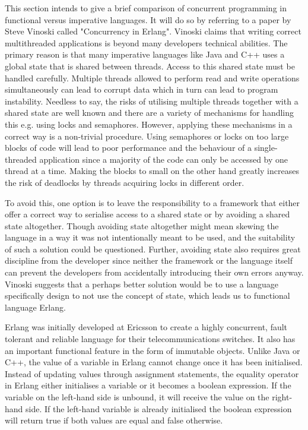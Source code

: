 \documentclass[conference]{IEEEtran}
\begin{document}
This section intends to give a brief comparison of concurrent programming in functional versus imperative languages. It will do so by referring to a paper by Steve Vinoski called "Concurrency in Erlang". Vinoski claims that writing correct multithreaded applications is beyond many developers technical abilities. The primary reason is that many imperative languages like Java and C++ uses a global state that is shared between threads. Access to this shared state must be handled carefully. Multiple threads allowed to perform read and write operations simultaneously can lead to corrupt data which in turn can lead to program instability. Needless to say, the risks of utilising multiple threads together with a shared state are well known and there are a variety of mechanisms for handling this e.g. using locks and semaphores. However, applying these mechanisms in a correct way is a non-trivial procedure. Using semaphores or locks on too large blocks of code will lead to poor performance and the behaviour of a single-threaded application since a majority of the code can only be accessed by one thread at a time. Making the blocks to small on the other hand greatly increases the risk of deadlocks by threads acquiring locks in different order.

To avoid this, one option is to leave the responsibility to a framework that either offer a correct way to serialise access to a shared state or by avoiding a shared state altogether. Though avoiding state altogether might mean skewing the language in a way it was not intentionally meant to be used, and the suitability of such a solution could be questioned. Further, avoiding state also requires great discipline from the developer since neither the framework or the language itself can prevent the developers from accidentally introducing their own errors anyway. Vinoski suggests that a perhaps better solution would be to use a language specifically design to not use the concept of state, which leads us to functional language Erlang.

Erlang was initially developed at Ericsson to create a highly concurrent, fault tolerant and reliable language for their telecommunications switches. It also has an important functional feature in the form of immutable objects. Unlike Java or C++, the value of a variable in Erlang cannot change once it has been initialised. Instead of updating values through assignment statements, the equality operator in Erlang either initialises a variable or it becomes a boolean expression. If the variable on the left-hand side is unbound, it will receive the value on the right-hand side. If the left-hand variable is already initialised the boolean expression will return true if both values are equal and false otherwise.
\end{document}
